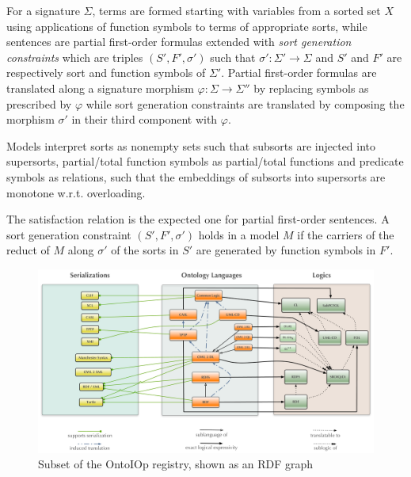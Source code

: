 \documentclass[10pt, a4paper]{isov2}
\begin{document}
For a signature $\Sigma$, terms are formed starting with
variables from a sorted set $X$ using 
applications of function symbols to terms of appropriate sorts, while
sentences are partial first-order formulas extended with
\emph{sort generation constraints} which are triples $(S', F', \sigma')$ such that 
$\sigma':\Sigma'\rightarrow\Sigma$ and $S'$ and $F'$ are respectively sort and function symbols of
$\Sigma'$. 
Partial first-order formulas are translated along a signature morphism 
$\varphi:\Sigma\rightarrow\Sigma''$ by replacing symbols as prescribed by $\varphi$
while sort generation constraints are translated by
composing the morphism $\sigma'$ in their third component with $\varphi$.

Models interpret sorts as nonempty sets such that subsorts are injected into supersorts,
partial/total function symbols as partial/total functions and 
predicate symbols as relations,
 such that the embeddings of subsorts into
supersorts are monotone w.r.t. overloading.

The satisfaction relation is the expected one for partial first-order sentences. A sort generation
constraint $(S', F', \sigma')$ holds in a model $M$ if the carriers of the reduct of $M$ along $\sigma'$ 
of the sorts in $S'$ are generated by function symbols in $F'$.



\cleardoublepage
{}\label{a:graph}

\begin{figure}
\centering
   \includegraphics[width=\textwidth]{illustrations/DOL-ontograph-layers-OMG} 
  \caption{Subset of the OntoIOp registry, shown as an RDF graph}
\label{f:DOL-threelayers}
\end{figure}
\end{document}
